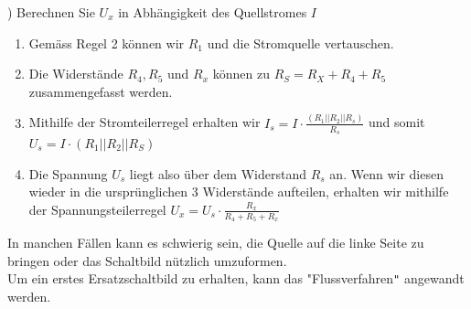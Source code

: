) Berechnen Sie $U_x$ in Abhängigkeit des Quellstromes $I$
\begin{center}
	\fix
\end{center}
\fix
\iend
{}
\beginbsp
\begin{enumerate}
	\item Gemäss Regel 2 können wir $R_1$ und die Stromquelle vertauschen.
	\item Die Widerstände $R_4 , R_5$ und $ R_x $ können zu $ R_S = R_X + R_4 + R_5 $ zusammengefasst werden.
	\item Mithilfe der Stromteilerregel erhalten wir $ I_s = I \cdot \frac{(R_1 || R_2 || R_s)}{R_s} $ und somit $U_s = I \cdot (R_1 || R_2 || R_S) $
	\item Die Spannung $U_s$ liegt also über dem Widerstand $R_s$ an. Wenn wir diesen wieder in die ursprünglichen 3 Widerstände aufteilen, erhalten wir mithilfe der Spannungsteilerregel $U_x = U_s \cdot \frac{R_x}{R_4 + R_5 + R_x} $
\end{enumerate}

\iend

In manchen Fällen kann es schwierig sein, die Quelle auf die linke Seite zu bringen oder das Schaltbild nützlich umzuformen. \\
Um ein erstes Ersatzschaltbild zu erhalten, kann das "Flussverfahren\texttt{"} angewandt werden.

